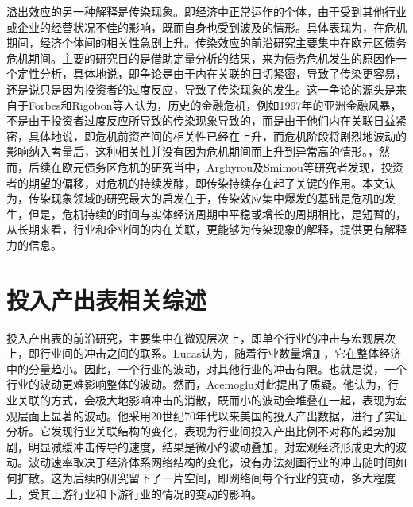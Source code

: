 \documentclass{sysuthesis}
\begin{document}
溢出效应的另一种解释是传染现象。即经济中正常运作的个体，由于受到其他行业或企业的经营状况不佳的影响，既而自身也受到波及的情形。具体表现为，在危机期间，经济个体间的相关性急剧上升。传染效应的前沿研究主要集中在欧元区债务危机期间。主要的研究目的是借助定量分析的结果，来为债务危机发生的原因作一个定性分析，具体地说，即争论是由于内在关联的日切紧密，导致了传染更容易，还是说只是因为投资者的过度反应，导致了传染现象的发生。这一争论的源头是来自于Forbes和Rigobon等人认为，历史的金融危机，例如1997年的亚洲金融风暴，不是由于投资者过度反应所导致的传染现象导致的，而是由于他们内在关联日益紧密，具体地说，即危机前资产间的相关性已经在上升，而危机阶段将剧烈地波动的影响纳入考量后，这种相关性并没有因为危机期间而上升到异常高的情形。\cite{forbes_no_2002-1}，然而，后续在欧元债务区危机的研究当中，Arghyrou\cite{arghyrou_emu_2012}及Smimou等研究者发现\cite{smimou_intensity_2015}，投资者的期望的偏移，对危机的持续发酵，即传染持续存在起了关键的作用。本文认为，传染现象领域的研究最大的启发在于，传染效应集中爆发的基础是危机的发生，但是，危机持续的时间与实体经济周期中平稳或增长的周期相比，是短暂的，从长期来看，行业和企业间的内在关联，更能够为传染现象的解释，提供更有解释力的信息。

\section{投入产出表相关综述}

投入产出表的前沿研究，主要集中在微观层次上，即单个行业的冲击与宏观层次上，即行业间的冲击之间的联系。Lucas\cite{lucas_understanding_1977}认为，随着行业数量增加，它在整体经济中的分量趋小。因此，一个行业的波动，对其他行业的冲击有限。也就是说，一个行业的波动更难影响整体的波动。然而，Acemoglu\cite{acemoglu_network_2012}对此提出了质疑。他认为，行业关联的方式，会极大地影响冲击的消散，既而小的波动会堆叠在一起，表现为宏观层面上显著的波动。他采用20世纪70年代以来美国的投入产出数据，进行了实证分析。它发现行业关联结构的变化，表现为行业间投入产出比例不对称的趋势加剧，明显减缓冲击传导的速度，结果是微小的波动叠加，对宏观经济形成更大的波动。波动速率取决于经济体系网络结构的变化，没有办法刻画行业的冲击随时间如何扩散。这为后续的研究留下了一片空间，即网络间每个行业的变动，多大程度上，受其上游行业和下游行业的情况的变动的影响。
\end{document}
